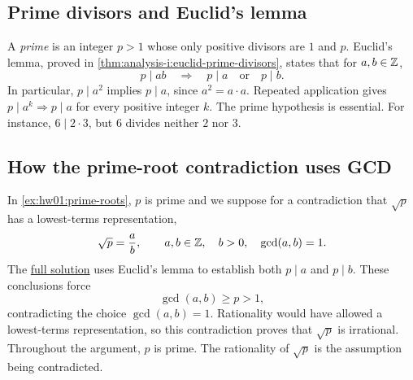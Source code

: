 \subsection{Prime divisors and Euclid's lemma}
A \emph{prime} is an integer $p>1$ whose only positive divisors are
$1$ and $p$. Euclid's lemma, proved in
\autoref{thm:analysis-i:euclid-prime-divisors}, states that for
$a,b\in\mathbb{Z}$,
\[
  p\mid ab\quad\Longrightarrow\quad
  p\mid a\quad\text{or}\quad p\mid b.
\]
In particular, $p\mid a^2$ implies $p\mid a$, since $a^2=a\cdot a$.
Repeated application gives $p\mid a^k\Longrightarrow p\mid a$ for
every positive integer $k$.
The prime hypothesis is essential. For instance, $6\mid2\cdot3$,
but $6$ divides neither $2$ nor $3$.

\subsection{How the prime-root contradiction uses GCD}
In \autoref{ex:hw01:prime-roots}, $p$ is prime and we suppose for a
contradiction that $\sqrt p$ has a lowest-terms representation,
\[
  \sqrt p=\frac ab,\qquad
  a,b\in\mathbb{Z},\quad b>0,\quad\gcd(a,b)=1.
\]
The \hyperref[sol:hw01:prime-roots]{full solution} uses Euclid's lemma
to establish both $p\mid a$ and $p\mid b$. These conclusions force
\[
  \gcd(a,b)\ge p>1,
\]
contradicting the choice $\gcd(a,b)=1$. Rationality would have allowed
a lowest-terms representation, so this contradiction proves that
$\sqrt p$ is irrational. Throughout the argument, $p$ is prime.
The rationality of $\sqrt p$ is the assumption being contradicted.
